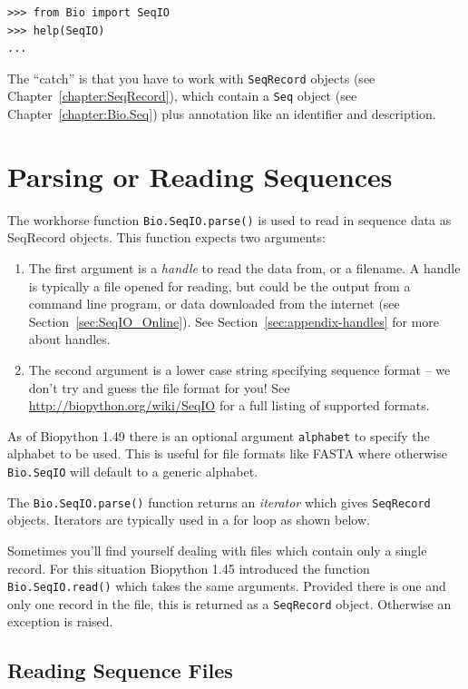 \documentclass{report}
\begin{document}
\begin{verbatim}
>>> from Bio import SeqIO
>>> help(SeqIO)
...
\end{verbatim}

The ``catch'' is that you have to work with \verb|SeqRecord| objects (see Chapter~\ref{chapter:SeqRecord}), which contain a \verb|Seq| object (see Chapter~\ref{chapter:Bio.Seq}) plus annotation like an identifier and description.

\section{Parsing or Reading Sequences}
\label{sec:Bio.SeqIO-input}

The workhorse function \verb|Bio.SeqIO.parse()| is used to read in sequence data as SeqRecord objects.  This function expects two arguments:

\begin{enumerate}
\item The first argument is a {\it handle} to read the data from, or a filename. A handle is typically a file opened for reading, but could be the output from a command line program, or data downloaded from the internet (see Section~\ref{sec:SeqIO_Online}).  See Section~\ref{sec:appendix-handles} for more about handles.
\item The second argument is a lower case string specifying sequence format -- we don't try and guess the file format for you!  See \url{http://biopython.org/wiki/SeqIO} for a full listing of supported formats.
\end{enumerate}

\noindent As of Biopython 1.49 there is an optional argument \verb|alphabet| to specify the alphabet to be used.  This is useful for file formats like FASTA where otherwise \verb|Bio.SeqIO| will default to a generic alphabet.

The \verb|Bio.SeqIO.parse()| function returns an {\it iterator} which gives \verb|SeqRecord| objects.  Iterators are typically used in a for loop as shown below.

Sometimes you'll find yourself dealing with files which contain only a single record.  For this situation Biopython 1.45 introduced the function \verb|Bio.SeqIO.read()| which takes the same arguments.  Provided there is one and only one record in the file, this is returned as a \verb|SeqRecord| object.  Otherwise an exception is raised.

\subsection{Reading Sequence Files}
\end{document}
